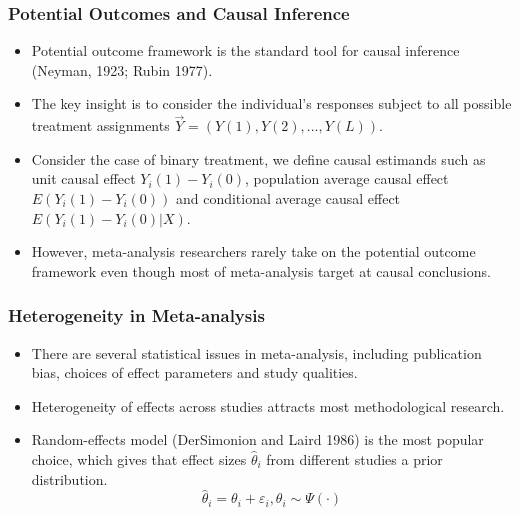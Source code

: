 \documentclass[xetex,mathserif,serif]{beamer}
\begin{document}
\begin{frame}
  \frametitle{Potential Outcomes and Causal Inference}
  \begin{itemize}
  \item Potential outcome framework is the standard tool for causal inference
    (Neyman, 1923; Rubin 1977). 
  \item The key insight is to consider the individual's responses subject to all
    possible treatment assignments $\vec Y=(Y(1), Y(2), \ldots, Y(L))$.
  \item Consider the case of binary treatment, we define causal estimands such as
    unit causal effect $Y_i(1)-Y_i(0)$, population average causal effect
    $E(Y_i(1)-Y_i(0))$ and conditional average causal effect $E(Y_i(1)-Y_i(0)|X)$.
    \pause
  \item However, meta-analysis researchers rarely take on the potential outcome
    framework even though most of meta-analysis target at causal conclusions.
  \end{itemize}
\end{frame}

\begin{frame}
  \frametitle{Heterogeneity in Meta-analysis}
  \begin{itemize}
  \item There are several statistical issues in meta-analysis, including
    publication bias, choices of effect parameters and study qualities.
    \pause
  \item Heterogeneity of effects across studies attracts most methodological
    research.  \pause
  \item Random-effects model (DerSimonion and Laird 1986) is the most popular
    choice, which gives that effect sizes $\hat\theta_i$ from different studies a
    prior distribution.
    \[\hat\theta_i=\theta_i+\varepsilon_i, \theta_i\sim \Psi(\cdot)\]
  \end{itemize}
\end{frame}
\end{document}
